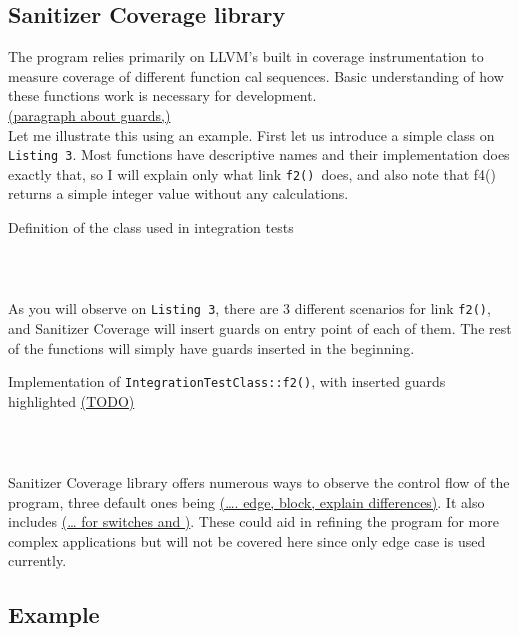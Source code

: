 \documentclass{elteikthesis}[2018/06/06]
\begin{document}
\subsection{Sanitizer Coverage library}
\label{sec-3-2-1}
The program relies primarily on LLVM's built in coverage instrumentation to measure coverage of different function cal sequences. Basic understanding of how these functions work is necessary for development. \\

\uline{(paragraph about guards,)} \\


Let me illustrate this using an example. First let us introduce a simple class on \texttt{Listing 3}. Most functions have descriptive names and their implementation does exactly that, so I will explain only what link \texttt{f2() }does, and also note that f4() returns a simple integer value without any calculations. \\
\begin{listing}
\caption{Definition of the class used in integration tests}
\inputminted[firstline=3,lastline=16]{c++}{test/integrationTestClass.h} \\
\end{listing}

As you will observe on \texttt{Listing 3}, there are 3 different scenarios for link \texttt{f2()}, and Sanitizer Coverage will insert guards on entry point of each of them. The rest of the functions will simply have guards inserted in the beginning. \\

\begin{listing}
\caption{Implementation of \texttt{IntegrationTestClass::f2()}, with inserted guards highlighted \uline{(TODO)}}
\inputminted[firstline=12,lastline=22]{c++}{test/integrationTestClass.cc} \\
\end{listing}

Sanitizer Coverage library offers numerous ways to observe the control flow of the program, three default ones being \uline{(\ldots{}. edge, block, explain differences)}. It also includes \uline{(\ldots{} for switches and )}. These could aid in refining the program for more complex applications but will not be covered here since only edge case is used currently. \\
\subsection{Example}
\label{sec-3-2-2}
\end{document}
